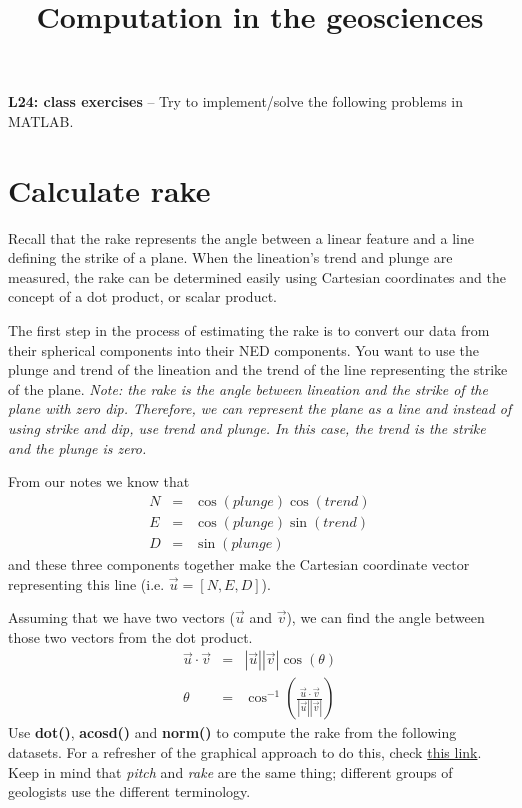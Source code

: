 \documentclass[10pt,fleqn]{article}
\title{Computation in the geosciences}
\date{\empty}
\begin{document}
\textbf{L24: class exercises} -- Try to implement/solve the following problems in MATLAB.

\section*{Calculate rake}

Recall that the rake represents the angle between a linear feature and a line defining the strike of a plane.  When the lineation’s trend and plunge are measured, the rake can be determined easily using Cartesian coordinates and the concept of a dot product, or scalar product. 

The first step in the process of estimating the rake is to convert our data from their spherical components into their NED components. You want to use the plunge and trend of the lineation and the trend of the line representing the strike of the plane. \textit{Note: the rake is the angle between lineation and the strike of the plane with zero dip. Therefore, we can represent the plane as a line and instead of using strike and dip, use trend and plunge. In this case, the trend is the strike and the plunge is zero.}

From our notes we know that 
\begin{eqnarray}
  N &=& \cos(plunge)\cos(trend) \\
  E &=& \cos(plunge)\sin(trend) \\
  D &=& \sin(plunge)
\end{eqnarray}
and these three components together make the Cartesian coordinate vector representing this line (i.e. $\vec{u}=[N, E, D]$).

Assuming that we have two vectors ($\vec{u}$ and $\vec{v}$), we can find the angle between those two vectors from the dot product.
\begin{eqnarray} \nonumber
  \vec{u}\cdot\vec{v} &=& |\vec{u}||\vec{v}|\cos(\theta) \\ \nonumber
  \theta &=& \cos^{-1}\left(\frac{\vec{u}\cdot\vec{v}}{|\vec{u}||\vec{v}|}\right)
\end{eqnarray}
Use \textbf{dot()}, \textbf{acosd()} and \textbf{norm()} to compute the rake from the following datasets. For a refresher of the graphical approach to do this, check \href{https://www.uwgb.edu/dutchs/structge/SL85FindPitch.HTM}{this link}. Keep in mind that \textit{pitch} and \textit{rake} are the same thing; different groups of geologists use the different terminology.
\end{document}
